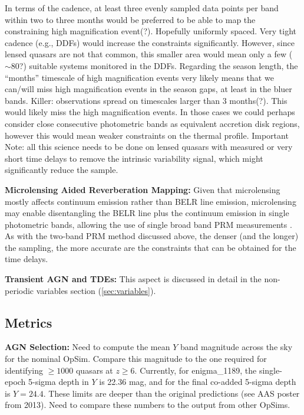 In terms of the cadence, at least three evenly sampled data points per
band within two to three months would be preferred to be able to map
the constraining high magnification event(?). Hopefully uniformly
spaced. Very tight cadence (e.g., DDFs) would increase the constraints
significantly. However, since lensed quasars are not that common, this
smaller area would mean only a few ($\sim80$?) suitable systems
monitored in the DDFs.
%
Regarding the season length, the ``months'' timescale of high
magnification events very likely means that we can/will miss high
magnification events in the season gaps, at least in the bluer bands.
%
Killer: observations spread on timescales larger than 3 months(?).
This would likely miss the high magnification events. In those cases
we could perhaps consider close consecutive photometric bands as
equivalent accretion disk regions, however this would mean weaker
constraints on the thermal profile.
%
Important Note: all this science needs to be done on lensed quasars
with measured or very short time delays to remove the intrinsic
variability signal, which might significantly reduce the sample.

{\bf Microlensing Aided Reverberation Mapping:} Given that
microlensing mostly affects continuum emission rather than BELR line
emission, microlensing may enable disentangling the BELR line plus the
continuum emission in single photometric bands, allowing the use of
single broad band PRM measurements \citep{SluseandTewes2014}. As with
the two-band PRM method discussed above, the denser (and the longer)
the sampling, the more accurate are the constraints that can be
obtained for the time delays.

{\bf Transient AGN and TDEs:} This aspect is discussed in detail in
the non-periodic variables section (\autoref{sec:variables}).


\subsection{Metrics}
\label{sec:\secname:metrics}


{\bf AGN Selection:} Need to compute the mean $Y$ band magnitude
across the sky for the nominal OpSim. Compare this magnitude to the
one required for identifying $\geq1000$ quasars
at $z\geq6$. Currently, for enigma\_1189, the single-epoch 5-sigma
depth in $Y$ is 22.36 mag, and for the final co-added 5-sigma depth is
$Y=24.4$. These limits are deeper than the original predictions (see
AAS poster from 2013). Need to compare these numbers to the output
from other OpSims.

